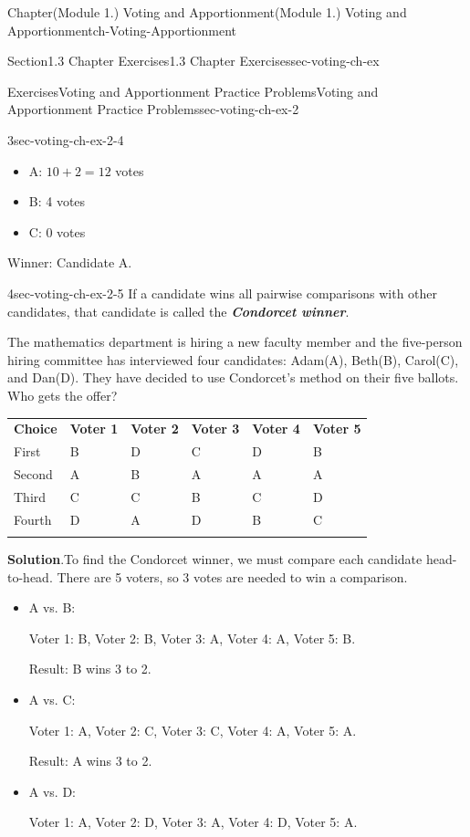 \documentclass[oneside,10pt,]{book}
\newcommand{\blocktitlefont}{\relax}
\newcommand{\tabularfont}{\relax}
\newcommand{\ptxlistdisc}{\raisebox{0.3ex}{\textbullet}}
\newcommand{\alert}[1]{\textbf{\textit{#1}}}
\newcommand{\hrulethin}  {\noalign{\hrule height 0.04em}}
\begin{document}
\begin{chapterptx}{Chapter}{(Module 1.) Voting and Apportionment}{}{(Module 1.) Voting and Apportionment}{}{}{ch-Voting-Apportionment}
\begin{sectionptx}{Section}{1.3 Chapter Exercises}{}{1.3 Chapter Exercises}{}{}{sec-voting-ch-ex}
\begin{exercises-subsection-numberless}{Exercises}{Voting and Apportionment Practice Problems}{}{Voting and Apportionment Practice Problems}{}{}{sec-voting-ch-ex-2}
\begin{divisionexercise}{3}{}{}{sec-voting-ch-ex-2-4}
\begin{enumerate}[label={(\alph*)}]
\begin{itemize}[label=\ptxlistdisc]
\item{}A: \(10 + 2 = 12\) votes%
\item{}B: 4 votes%
\item{}C: 0 votes%
\end{itemize}
Winner: Candidate A.%
\end{enumerate}
%
\end{divisionexercise}%
\begin{divisionexercise}{4}{}{}{sec-voting-ch-ex-2-5}%
If a candidate wins all pairwise comparisons with other candidates, that candidate is called the \alert{Condorcet winner}.%
\par
The mathematics department is hiring a new faculty member and the five-person hiring committee has interviewed four candidates: Adam(A), Beth(B), Carol(C), and Dan(D). They have decided to use Condorcet's method on their five ballots. Who gets the offer?%
\begin{center}%
{\tabularfont%
\begin{tabular}{llllll}\hrulethin
{\bfseries{}Choice}&{\bfseries{}Voter 1}&{\bfseries{}Voter 2}&{\bfseries{}Voter 3}&{\bfseries{}Voter 4}&{\bfseries{}Voter 5}\tabularnewline\hrulethin
First&B&D&C&D&B\tabularnewline\hrulethin
Second&A&B&A&A&A\tabularnewline\hrulethin
Third&C&C&B&C&D\tabularnewline\hrulethin
Fourth&D&A&D&B&C\tabularnewline\hrulethin
\end{tabular}
}%
\end{center}%
\par\smallskip%
\noindent\textbf{\blocktitlefont Solution}.\hypertarget{sec-voting-ch-ex-2-5-2}{}\quad{}To find the Condorcet winner, we must compare each candidate head-to-head. There are 5 voters, so 3 votes are needed to win a comparison.%
\par
%
\begin{itemize}[label=\ptxlistdisc]
\item{}A vs. B:%
\par
Voter 1: B, Voter 2: B, Voter 3: A, Voter 4: A, Voter 5: B.%
\par
Result: B wins 3 to 2.%
\item{}A vs. C:%
\par
Voter 1: A, Voter 2: C, Voter 3: C, Voter 4: A, Voter 5: A.%
\par
Result: A wins 3 to 2.%
\item{}A vs. D:%
\par
Voter 1: A, Voter 2: D, Voter 3: A, Voter 4: D, Voter 5: A.%
\par

\end{itemize}
\end{divisionexercise}
\end{exercises-subsection-numberless}
\end{sectionptx}
\end{chapterptx}
\end{document}
